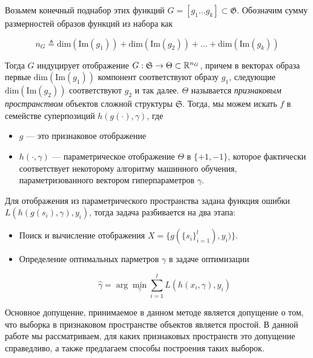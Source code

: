 \documentclass[a4paper, 10pt]{article}
\begin{document}
Возьмем конечный поднабор этих функций $G = [g_1\ldots g_k] \subset \mathfrak{G}$.
Обозначим сумму размерностей образов функций из набора как

$$
n_G \triangleq \mathrm{dim}(\mathrm{Im}(g_1)) +
\mathrm{dim}(\mathrm{Im}(g_2)) + \ldots +
\mathrm{dim}(\mathrm{Im}(g_k))
$$

Тогда $G$ индуцирует отображение $G: \mathfrak{S} \to \Theta \subset \mathbb{R}^{n_G}$,
причем в векторах образа первые $\mathrm{dim}(\mathrm{Im}(g_1))$ компонент соответствуют
образу $g_1$, следующие $\mathrm{dim}(\mathrm{Im}(g_2))$ соответствуют $g_2$
и так далее. $\Theta$ называется \textit{признаковым пространством}
объектов сложной структуры $\mathfrak{S}$. Тогда, мы можем искать $f$ в семействе
суперпозиций $h(g(\cdot), \gamma)$, где

\begin{itemize}
    \item $g$ --- это признаковое отображение
    \item $h(\cdot, \gamma)$ --- параметрическое отображение $\Theta$ в $\{+1, -1\}$,
    которое фактически соответствует некоторому алгоритму машинного обучения,
    параметризованного вектором гиперпараметров $\gamma$.
\end{itemize}

Для отображения из параметрического пространства задана функция ошибки
$L(h(g(s_i), \gamma), y_i)$, тогда задача разбивается на два этапа:

\begin{itemize}
    \item Поиск и вычисление отображения $X = \{g(\{s_i\}_{i=1}^l), y_i)\}$.
    \item Определение оптимальных парметров $\gamma$ в задаче оптимизации

    $$
    \hat{\gamma} = \arg\min_{\gamma} \sum_{i=1}^{l}L(h(x_i, \gamma), y_i)
    $$
\end{itemize}

Основное допущение, принимаемое в данном методе является допущение о том, что
выборка в признаковом пространстве объектов является простой. В данной работе
мы рассматриваем, для каких признаковых пространств это допущение справедливо,
а также предлагаем способы построения таких выборок.
\end{document}

